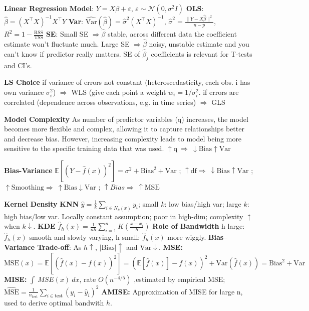 \documentclass[9pt]{article}
\renewcommand\small{\footnotesize}
\newcommand{\toptopic}[1]{\textbf{{#1}}}
\newcommand{\topic}[1]{\small{\textbf{\textcolor{Sepia}{#1}}}}
\begin{document}
\begin{multicols*}{3}
\raggedcolumns 

\toptopic{Linear Regression}
\topic{Model}: $Y = X\beta + \varepsilon$, $\varepsilon \sim \mathcal{N}(0, \sigma^2 I)$  
\topic{OLS}: $\hat{\beta} = (X^\top X)^{-1}X^\top Y$  
\topic{Var}: $\widehat{\mathrm{Var}}(\hat{\beta}) = \hat{\sigma}^2 (X^\top X)^{-1}$,  
$\hat{\sigma}^2 = \frac{\|Y - X\hat{\beta}\|^2}{n-p}$,
$R^2 = 1 - \frac{\text{RSS}}{\text{TSS}}$
\topic{SE}: Small SE  $\Rightarrow \hat{\beta}$  stable, across different data the coefficient estimate won't fluctuate much. Large SE $\Rightarrow \hat{\beta}$ noisy, unstable estimate and you can't know if predictor really matters. SE of $\hat{\beta}_j$ coefficients is relevant for T-tests and CI's. 

\topic{LS Choice} if variance of errors not constant (heteroscedasticity, each obs. i has own variance $\sigma_i^2$) $\Rightarrow$ WLS (give each point a weight $w_i=1/\sigma_i^2$. if errors are correlated (dependence across observations, e.g. in time series) $\Rightarrow$ GLS

\toptopic{Model Complexity}
As number of predictor variables (q) increases, the model becomes more flexible and complex, allowing it to capture relationships better and decrease bias. However, increasing complexity leads to model being more sensitive to the specific training data that was used. $\uparrow\text{q} \ \Rightarrow \ \downarrow \text{Bias} \uparrow \text{Var}$

\toptopic{Bias-Variance}
$\mathbb{E}[(Y - \hat{f}(x))^2] = \sigma^2 + \mathrm{Bias}^2 + \mathrm{Var}$ ; $\uparrow \text{df}  \Rightarrow \ \downarrow \text{Bias} \uparrow \text{Var}$ ; $\uparrow\text{Smoothing} \Rightarrow \ \uparrow \text{Bias} \downarrow \text{Var}$ ; $\uparrow Bias \Rightarrow \ \uparrow \text{MSE}$

\toptopic{Kernel Density}
\topic{KNN}
$\hat y=\frac{1}{k}\sum_{i\in N_k(x)}y_i$; small $k$: low bias/high var; large $k$: high bias/low var. Locally constant assumption; poor in high-dim; complexity $\uparrow$ when $k \downarrow$.
\topic{KDE}
$\hat{f}_h(x) = \frac{1}{nh}\sum_{i=1}^n K\!\left( \frac{x - x_i}{h} \right)$ \topic{Role of Bandwidth} h large: $\hat{f}_h(x)$ smooth and slowly varying, h small:  $\hat{f}_h(x)$ more wiggly. \topic{Bias–Variance Trade-off}: As $h \uparrow$, $|\mathrm{Bias}| \uparrow$ and $\mathrm{Var}\downarrow$. \topic{MSE:}
$\mathrm{MSE}(x) = \mathbb{E}[(\hat{f}(x)-f(x))^2] = (\mathbb{E}[\hat{f}(x)]-f(x))^2 + \mathrm{Var}(\hat{f}(x)) = \text{Bias}^2 + \text{Var}$ \topic{MISE:} $\int \ MSE(x) \ dx$, rate $O(n^{-4/5})$ ,estimated by empirical MSE; $\widehat{\text{MSE}} = \frac{1}{n_{\text{test}}} \sum_{i \in \text{test}} (y_i - \hat{y}_i)^2$
\topic{AMISE:} Approximation of MISE for large n, used to derive optimal bandwith $h$.


\end{multicols*}
\end{document}
